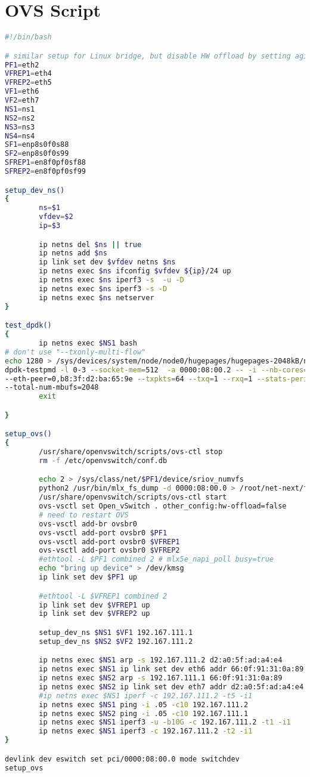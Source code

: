 \section{OVS Script} \label{sec:bash_script}
\begin{lstlisting}[language=sh, caption={Bash Script for Database Backup}, label={lst:bash_script}]
#!/bin/bash

# similar setup for Linux bridge, but disable HW offload by setting aging=0
PF1=eth2
VFREP1=eth4
VFREP2=eth5
VF1=eth6
VF2=eth7
NS1=ns1
NS2=ns2
NS3=ns3
NS4=ns4
SF1=enp8s0f0s88
SF2=enp8s0f0s99
SFREP1=en8f0pf0sf88
SFREP2=en8f0pf0sf99

setup_dev_ns()
{
        ns=$1
        vfdev=$2
        ip=$3

        ip netns del $ns || true
        ip netns add $ns
        ip link set dev $vfdev netns $ns
        ip netns exec $ns ifconfig $vfdev ${ip}/24 up
        ip netns exec $ns iperf3 -s  -u -D
        ip netns exec $ns iperf3 -s -D
        ip netns exec $ns netserver
}

test_dpdk()
{
        ip netns exec $NS1 bash
# don't use "--txonly-multi-flow"
echo 1280 > /sys/devices/system/node/node0/hugepages/hugepages-2048kB/nr_hugepages
dpdk-testpmd -l 0-3 --socket-mem=512  -a 0000:08:00.2 -- -i --nb-cores=1 --forward-mode=txonly \
--eth-peer=0,b8:3f:d2:ba:65:9e --txpkts=64 --txq=1 --rxq=1 --stats-period=1 --txonly-multi-flow \
--total-num-mbufs=2048
        exit

}

setup_ovs()
{
        /usr/share/openvswitch/scripts/ovs-ctl stop
        rm -f /etc/openvswitch/conf.db

        echo 2 > /sys/class/net/$PF1/device/sriov_numvfs
        python2 /usr/bin/mlx_fs_dump -d 0000:08:00.0 > /root/net-next/fdb.txt
        /usr/share/openvswitch/scripts/ovs-ctl start
        ovs-vsctl set Open_vSwitch . other_config:hw-offload=false 
        # need to restart OVS
        ovs-vsctl add-br ovsbr0
        ovs-vsctl add-port ovsbr0 $PF1
        ovs-vsctl add-port ovsbr0 $VFREP1
        ovs-vsctl add-port ovsbr0 $VFREP2
        #ethtool -L $PF1 combined 2 # mlx5e_napi_poll busy=true
        echo "bring up device" > /dev/kmsg
        ip link set dev $PF1 up

        #ethtool -L $VFREP1 combined 2
        ip link set dev $VFREP1 up
        ip link set dev $VFREP2 up

        setup_dev_ns $NS1 $VF1 192.167.111.1
        setup_dev_ns $NS2 $VF2 192.167.111.2

        ip netns exec $NS1 arp -s 192.167.111.2 d2:a0:5f:ad:a4:e4
        ip netns exec $NS1 ip link set dev eth6 addr 66:0f:91:31:0a:89
        ip netns exec $NS2 arp -s 192.167.111.1 66:0f:91:31:0a:89
        ip netns exec $NS2 ip link set dev eth7 addr d2:a0:5f:ad:a4:e4
        #ip netns exec $NS1 iperf -c 192.167.111.2 -t5 -i1
        ip netns exec $NS1 ping -i .05 -c10 192.167.111.2
        ip netns exec $NS2 ping -i .05 -c10 192.167.111.1
        ip netns exec $NS1 iperf3 -u -b10G -c 192.167.111.2 -t1 -i1
        ip netns exec $NS1 iperf3 -c 192.167.111.2 -t2 -i1
}

devlink dev eswitch set pci/0000:08:00.0 mode switchdev
setup_ovs
\end{lstlisting}
